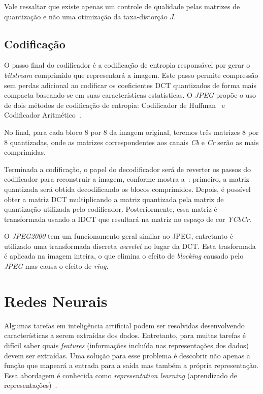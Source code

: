 Vale ressaltar que existe apenas um controle de qualidade pelas matrizes de quantização e não uma otimização da taxa-distorção $J$.
\subsection{Codificação}
O passo final do codificador é a codificação de entropia responsável por gerar o \textit{bitstream} comprimido que representará a imagem. Este passo permite compressão sem perdas adicional ao codificar os coeficientes \acrshort{DCT} quantizados de forma mais compacta baseando-se em suas características estatísticas. O \textit{JPEG} propõe o uso de dois métodos de codificação de entropia: Codificador de Huffman~\cite{huffman1952method} e Codificador Aritmético~\cite{pennebaker1988arithmetic}. 

No final, para cada bloco 8 por 8 da imagem original, teremos três matrizes 8 por 8 quantizadas, onde as matrizes correspondentes aos canais \textit{Cb} e \textit{Cr} serão as mais comprimidas.

Terminada a codificação, o papel do decodificador será de reverter os passos do codificador para reconstruir a imagem, conforme mostra a~: primeiro, a matriz quantizada será obtida decodificando os blocos comprimidos. Depois, é possível obter a matriz \acrshort{DCT} multiplicando a matriz quantizada pela matriz de quantização utilizada pelo codificador. Posteriormente, essa matriz é transformada usando a \acrshort{IDCT} que resultará na matriz no espaço de cor \textit{YCbCr}.

O \textit{JPEG2000} tem um funcionamento geral similar ao JPEG, entretanto é utilizado uma transformada discreta \textit{wavelet} no lugar da \acrshort{DCT}. Esta trasformada é aplicada na imagem inteira, o que elimina o efeito de \textit{blocking} causado pelo \textit{JPEG} mas causa o efeito de \textit{ring}.
\section{Redes Neurais}
Algumas tarefas em inteligência artificial podem ser resolvidas desenvolvendo características a serem extraídas dos dados. Entretanto, para muitas tarefas é difícil saber quais \textit{features} (informações incluída nas representações dos dados) devem ser extraídas. Uma solução para esse problema é descobrir não apenas a função que mapeará a entrada para a saída mas também a própria representação. Essa abordagem é conhecida como \textit{representation learning} (aprendizado de representações)~\cite{deeplearning}.

